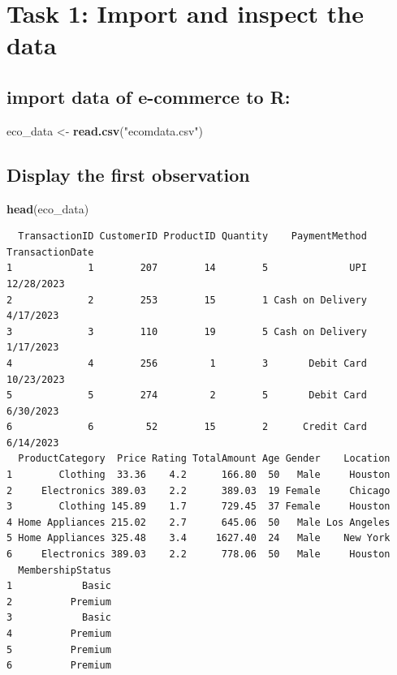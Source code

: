 \documentclass[
]{article}
\newenvironment{Shaded}{\begin{snugshade}}{\end{snugshade}}
\newcommand{\FunctionTok}[1]{\textcolor[rgb]{0.13,0.29,0.53}{\textbf{#1}}}
\newcommand{\NormalTok}[1]{#1}
\newcommand{\OtherTok}[1]{\textcolor[rgb]{0.56,0.35,0.01}{#1}}
\newcommand{\StringTok}[1]{\textcolor[rgb]{0.31,0.60,0.02}{#1}}
\begin{document}
\section{Task 1: Import and inspect the
data}\label{task-1-import-and-inspect-the-data}

\subsection{import data of e-commerce to
R:}\label{import-data-of-e-commerce-to-r}

\begin{Shaded}
\begin{Highlighting}[]
\NormalTok{eco\_data }\OtherTok{\textless{}{-}} \FunctionTok{read.csv}\NormalTok{(}\StringTok{"ecomdata.csv"}\NormalTok{)}
\end{Highlighting}
\end{Shaded}

\subsection{Display the first
observation}\label{display-the-first-observation}

\begin{Shaded}
\begin{Highlighting}[]
\FunctionTok{head}\NormalTok{(eco\_data)}
\end{Highlighting}
\end{Shaded}

\begin{verbatim}
  TransactionID CustomerID ProductID Quantity    PaymentMethod TransactionDate
1             1        207        14        5              UPI      12/28/2023
2             2        253        15        1 Cash on Delivery       4/17/2023
3             3        110        19        5 Cash on Delivery       1/17/2023
4             4        256         1        3       Debit Card      10/23/2023
5             5        274         2        5       Debit Card       6/30/2023
6             6         52        15        2      Credit Card       6/14/2023
  ProductCategory  Price Rating TotalAmount Age Gender    Location
1        Clothing  33.36    4.2      166.80  50   Male     Houston
2     Electronics 389.03    2.2      389.03  19 Female     Chicago
3        Clothing 145.89    1.7      729.45  37 Female     Houston
4 Home Appliances 215.02    2.7      645.06  50   Male Los Angeles
5 Home Appliances 325.48    3.4     1627.40  24   Male    New York
6     Electronics 389.03    2.2      778.06  50   Male     Houston
  MembershipStatus
1            Basic
2          Premium
3            Basic
4          Premium
5          Premium
6          Premium
\end{verbatim}
\end{document}
